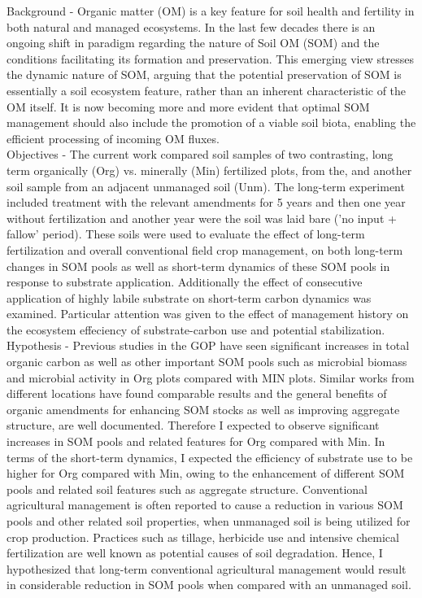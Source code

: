 	Background - Organic matter (OM) is a key feature for soil health and fertility in both natural and managed ecosystems. In the last few decades there is an ongoing shift in paradigm regarding the nature of Soil OM (SOM) and the conditions facilitating its formation and preservation. This emerging view stresses the dynamic nature of SOM, arguing that the potential preservation of SOM is essentially a soil ecosystem feature, rather than an inherent characteristic of the OM itself. It is now becoming more and more evident that optimal SOM management should also include the promotion of a viable soil biota, enabling the efficient processing of incoming OM fluxes.  \\

	Objectives - The current work compared soil samples of two contrasting, long term organically (Org) vs. minerally (Min) fertilized plots, from the, and another soil sample from an adjacent unmanaged soil (Unm). The long-term experiment included treatment with the relevant amendments for 5 years and then one year without fertilization and another year were the soil was laid bare ('no input + fallow' period). These soils were used to evaluate the effect of long-term fertilization and overall conventional field crop management, on both long-term changes in SOM pools as well as short-term dynamics of these SOM pools in response to substrate application. Additionally the effect of consecutive application of highly labile substrate on short-term carbon dynamics was examined. Particular attention was given to the effect of management history on the ecosystem effeciency of substrate-carbon use and potential stabilization.\\
	
	Hypothesis - Previous studies in the GOP have seen significant increases in total organic carbon as well as other important SOM pools such as microbial biomass and microbial activity in Org plots compared with MIN plots. Similar works from different locations have found comparable results and the general benefits of organic amendments for enhancing SOM stocks as well as improving aggregate  structure, are well documented. Therefore I expected to observe significant increases in SOM pools and related features for Org compared with Min. In terms of the short-term dynamics, I expected the efficiency of substrate use to be higher for Org compared with Min, owing to the enhancement of different SOM pools and related soil features such as aggregate structure. 
	Conventional agricultural management is often reported to cause a reduction in various SOM pools and other related soil properties, when unmanaged soil is being utilized for crop production. Practices such as tillage, herbicide use and intensive chemical fertilization are well known as potential causes of soil degradation. Hence, I hypothesized that long-term conventional agricultural management would result in considerable reduction in SOM pools when compared with an unmanaged soil.\\

